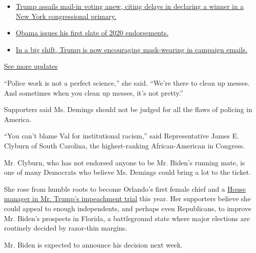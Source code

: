 \begin{itemize}
\tightlist
\item
  \href{https://www.nytimes3xbfgragh.onion/2020/08/03/us/elections/biden-vs-trump.html?action=click\&pgtype=Article\&state=default\&region=MAIN_CONTENT_1\&context=storylines_live_updates\#link-6494b448}{Trump
  assails mail-in voting anew, citing delays in declaring a winner in a
  New York congressional primary.}
\item
  \href{https://www.nytimes3xbfgragh.onion/2020/08/03/us/elections/biden-vs-trump.html?action=click\&pgtype=Article\&state=default\&region=MAIN_CONTENT_1\&context=storylines_live_updates\#link-3de249e6}{Obama
  issues his first slate of 2020 endorsements.}
\item
  \href{https://www.nytimes3xbfgragh.onion/2020/08/03/us/elections/biden-vs-trump.html?action=click\&pgtype=Article\&state=default\&region=MAIN_CONTENT_1\&context=storylines_live_updates\#link-54e34d20}{In
  a big shift, Trump is now encouraging mask-wearing in campaign
  emails.}
\end{itemize}

\href{https://www.nytimes3xbfgragh.onion/2020/08/03/us/elections/biden-vs-trump.html?action=click\&pgtype=Article\&state=default\&region=MAIN_CONTENT_1\&context=storylines_live_updates}{See
more updates}

``Police work is not a perfect science,'' she said. ``We're there to
clean up messes. And sometimes when you clean up messes, it's not
pretty.''

Supporters said Ms. Demings should not be judged for all the flaws of
policing in America.

``You can't blame Val for institutional racism,'' said Representative
James E. Clyburn of South Carolina, the highest-ranking African-American
in Congress.

Mr. Clyburn, who has not endorsed anyone to be Mr. Biden's running mate,
is one of many Democrats who believe Ms. Demings could bring a lot to
the ticket.

She rose from humble roots to become Orlando's first female chief and a
\href{https://www.nytimes3xbfgragh.onion/2020/01/15/us/politics/who-is-val-demings.html}{House
manager in Mr. Trump's impeachment trial} this year. Her supporters
believe she could appeal to enough independents, and perhaps even
Republicans, to improve Mr. Biden's prospects in Florida, a battleground
state where major elections are routinely decided by razor-thin margins.

Mr. Biden is expected to announce his decision next week.


